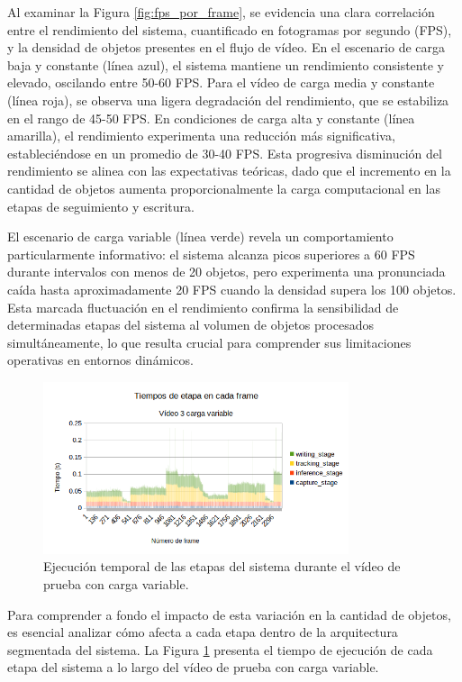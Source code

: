\documentclass[11pt,spanish,listoffigures,listoftables]{tfgetsinf}
\begin{document}
Al examinar la Figura \ref{fig:fps_por_frame}, se evidencia una clara correlación entre el rendimiento del sistema, cuantificado en fotogramas por segundo (FPS), y la densidad de objetos presentes en el flujo de vídeo. En el escenario de carga baja y constante (línea azul), el sistema mantiene un rendimiento consistente y elevado, oscilando entre 50-60 FPS. Para el vídeo de carga media y constante (línea roja), se observa una ligera degradación del rendimiento, que se estabiliza en el rango de 45-50 FPS. En condiciones de carga alta y constante (línea amarilla), el rendimiento experimenta una reducción más significativa, estableciéndose en un promedio de 30-40 FPS. Esta progresiva disminución del rendimiento se alinea con las expectativas teóricas, dado que el incremento en la cantidad de objetos aumenta proporcionalmente la carga computacional en las etapas de seguimiento y escritura.

El escenario de carga variable (línea verde) revela un comportamiento particularmente informativo: el sistema alcanza picos superiores a 60 FPS durante intervalos con menos de 20 objetos, pero experimenta una pronunciada caída hasta aproximadamente 20 FPS cuando la densidad supera los 100 objetos. Esta marcada fluctuación en el rendimiento confirma la sensibilidad de determinadas etapas del sistema al volumen de objetos procesados simultáneamente, lo que resulta crucial para comprender sus limitaciones operativas en entornos dinámicos.

\begin{figure}[H]
   \centering
   \includegraphics[width=0.8\textwidth]{images/analisis_de_la_solucion/tiempos_etapa.png}
   \caption{Ejecución temporal de las etapas del sistema durante el vídeo de prueba con carga variable.}
   \label{fig:tiempos_etapa}
\end{figure}

Para comprender a fondo el impacto de esta variación en la cantidad de objetos, es esencial analizar cómo afecta a cada etapa dentro de la arquitectura segmentada del sistema. La Figura \ref{fig:tiempos_etapa} presenta el tiempo de ejecución de cada etapa del sistema a lo largo del vídeo de prueba con carga variable.
\end{document}
